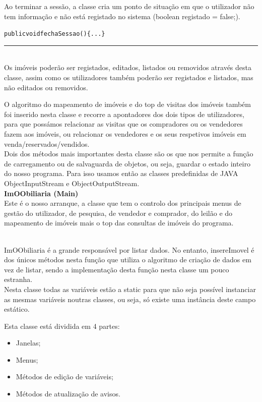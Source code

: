 \documentclass[12pt]{article}
\newenvironment{code}                    
{\textbf{
} \hspace{1cm} \hrulefill \\ 
\smallskip 
\begin{center}
\begin{minipage}{0.9\textwidth} 
\begin{alltt}\small}
{\end{alltt}
\end{minipage}
\end{center}
\hrule\smallskip
}
\begin{document}
Ao terminar a sessão, a classe cria um ponto de situação em que o utilizador não tem informação e não está registado no sistema (boolean registado = false;).
\newline
\begin{code}
public void fechaSessao()\{... \}
\end{code}
~\\

Os imóveis poderão ser registados, editados, listados ou removidos através desta classe, assim como os utilizadores também poderão ser registados e listados, mas não editados ou removidos.

O algoritmo do mapeamento de imóveis e do top de visitas dos imóveis também foi inserido nesta classe e recorre a apontadores dos dois tipos de utilizadores, para que possámos relacionar as visitas que os compradores ou os vendedores fazem aos imóveis, ou relacionar os vendedores e os seus respetivos imóveis em venda/reservados/vendidos.
~\\

Dois dos métodos mais importantes desta classe são os que nos permite a função de carregamento ou de salvaguarda de objetos, ou seja, guardar o estado inteiro do nosso programa.
Para isso usamos então as classes predefinidas de JAVA ObjectInputStream e ObjectOutputStream. 
~\\

\textbf{ImOObiliaria (Main)}
\newline
~\\

Este é o nosso arranque, a classe que tem o controlo dos principais menus de gestão do utilizador, de pesquisa, de vendedor e comprador, do leilão e do mapeamento de imóveis mais o top das consultas de imóveis do programa.

~\\

ImOObiliaria é a grande responsável por listar dados. No entanto, insereImovel é dos únicos métodos nesta função que utiliza o algoritmo de criação de dados em vez de listar, sendo a implementação desta função nesta classe um pouco estranha.
~\\

Nesta classe todas as variáveis estão a static para que não seja possível instanciar as mesmas
variáveis noutras classes, ou seja, só existe uma instância deste campo estático.

Esta classe está dividida em 4 partes:
\newline
\begin{itemize}
\item Janelas;
\item Menus;
\item Métodos de edição de variáveis;
\item Métodos de atualização de avisos.
\end{itemize}
\end{document}

